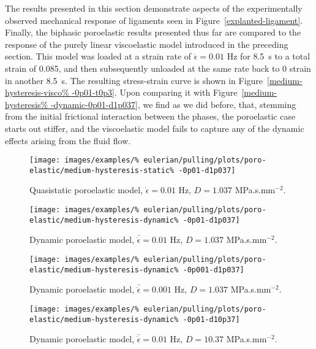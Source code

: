 The results presented in this section demonstrate aspects of the
experimentally observed mechanical response of ligaments seen in
Figure~\ref{explanted-ligament}. Finally, the biphasic poroelastic
results presented thus far are compared to the response of the purely
linear viscoelastic model introduced in the preceding section. This
model was loaded at a strain rate of $\dot{\epsilon}=0.01$ Hz for
8.5~s to a total strain of 0.085, and then subsequently unloaded at
the same rate back to 0 strain in another 8.5~s. The resulting
stress-strain curve is shown in Figure~\ref{medium-hysteresis-visco%
  -0p01-t0p3}. Upon comparing it with Figure~\ref{medium-hysteresis%
  -dynamic-0p01-d1p037}, we find as we did before, that, stemming from
the initial frictional interaction between the phases, the poroelastic
case starts out stiffer, and the viscoelastic model fails to capture
any of the dynamic effects arising from the fluid flow.

\begin{figure}[!hptb]
  \centering
  \texttt{[image: images/examples/\%
    eulerian/pulling/plots/poro-elastic/medium-hysteresis-static\%
    -0p01-d1p037]}
  \caption{Quasistatic poroelastic model, $\dot{\epsilon}=0.01$ Hz,
    $D=1.037$ MPa.s.mm$^{-2}$.}
  \label{medium-hysteresis-static-0p01-d1p037}
\end{figure}

\begin{figure}[!hptb]
  \centering
  \texttt{[image: images/examples/\%
    eulerian/pulling/plots/poro-elastic/medium-hysteresis-dynamic\%
    -0p01-d1p037]}
  \caption{Dynamic poroelastic model, $\bar{\dot{\epsilon}}=0.01$ Hz,
    $D=1.037$ MPa.s.mm$^{-2}$.}
  \label{medium-hysteresis-dynamic-0p01-d1p037}
\end{figure}

\begin{figure}[!hptb]
  \centering
  \texttt{[image: images/examples/\%
    eulerian/pulling/plots/poro-elastic/medium-hysteresis-dynamic\%
    -0p001-d1p037]}
  \caption{Dynamic poroelastic model, $\bar{\dot{\epsilon}}=0.001$ Hz,
    $D=1.037$ MPa.s.mm$^{-2}$.}
  \label{medium-hysteresis-dynamic-0p001-d1p037}
\end{figure}

\begin{figure}[!hptb]
  \centering
  \texttt{[image: images/examples/\%
    eulerian/pulling/plots/poro-elastic/medium-hysteresis-dynamic\%
    -0p01-d10p37]}
  \caption{Dynamic poroelastic model, $\bar{\dot{\epsilon}}=0.01$ Hz,
    $D=10.37$ MPa.s.mm$^{-2}$.}
  \label{medium-hysteresis-dynamic-0p01-d10p37}
\end{figure}

